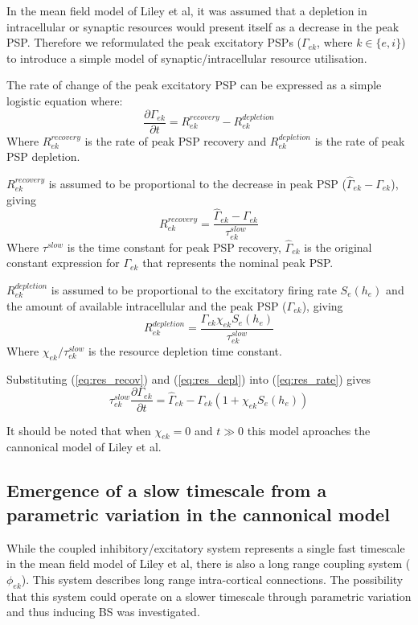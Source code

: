 \documentclass[a4paper,12pt]{article}
\begin{document}
In the mean field model of Liley et al, it was assumed that a depletion in intracellular or synaptic resources would present itself as a decrease in the peak PSP. Therefore we reformulated the peak excitatory PSPs ($\Gamma_{ek}$, where $k \in \{e, i\}$) to
introduce a simple model of synaptic/intracellular resource utilisation.

The rate of change of the peak excitatory PSP can be expressed as a simple logistic equation where:
\begin{equation}
\label{eq:res_rate}
\frac{\partial{\Gamma_{ek}}}{\partial{t}} = R_{ek}^{recovery} - R_{ek}^{depletion}
\end{equation}
\noindent
Where $R_{ek}^{recovery}$ is the rate of peak PSP recovery and $R_{ek}^{depletion}$ is the rate of peak PSP depletion.

$R_{ek}^{recovery}$ is assumed to be proportional to the decrease in peak PSP ($\hat{\Gamma}_{ek} - {\Gamma}_{ek}$), giving
\begin{equation}
\label{eq:res_recov}
R_{ek}^{recovery}= \frac{\hat{\Gamma}_{ek} - {\Gamma}_{ek}}{\tau_{ek}^{slow}}
\end{equation}
\noindent
Where $\tau^{slow}$ is the time constant for peak PSP recovery, $\hat{\Gamma}_{ek}$ is the original constant expression for $\Gamma_{ek}$ that represents the nominal peak PSP.

$R_{ek}^{depletion}$ is assumed to be proportional to the excitatory firing rate $S_e(h_e)$ and the amount of available intracellular and the peak PSP ($\Gamma_{ek}$), giving
\begin{equation}
\label{eq:res_depl}
R_{ek}^{depletion}= \frac{\Gamma_{ek} \chi_{ek}S_e(h_e)}{\tau_{ek}^{slow}}
\end{equation}
\noindent
Where $\chi_{ek}/\tau_{ek}^{slow}$ is the resource depletion time constant.

Substituting (\ref{eq:res_recov}) and (\ref{eq:res_depl}) into (\ref{eq:res_rate}) gives
\begin{equation} \label{eq:Gamma_ek}
{\tau^{slow}_{ek}} \frac{\partial{\Gamma_{ek}}}{\partial{t}} = \hat{\Gamma}_{ek} - \Gamma_{ek}(1 + \chi_{ek} S_e(h_e))
\end{equation}

It should be noted that when $\chi_{ek}=0$ and $t \gg 0$ this model aproaches the cannonical model of Liley et al.

\subsection{Emergence of a slow timescale from a parametric variation in the cannonical model}
While the coupled inhibitory/excitatory system represents a single fast timescale in the mean field model of Liley et al, there is also a long range coupling system ($\phi_{ek}$). This system describes long range intra-cortical connections. The possibility that this system could operate on a slower timescale through parametric variation and thus inducing BS was investigated.
\end{document}
